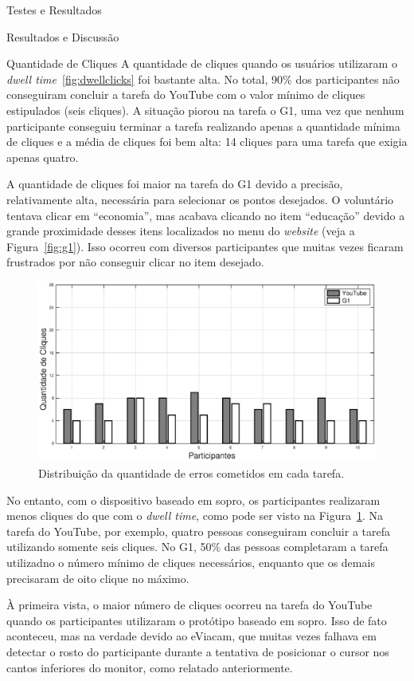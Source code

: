 \begin{chapter}{Testes e Resultados}
\begin{section}{Resultados e Discussão}
\begin{subsection}{Quantidade de Cliques}
A quantidade de cliques quando os usuários utilizaram o \textit{dwell
time}~\ref{fig:dwellclicks} foi bastante alta. No total, 90\% dos participantes
não conseguiram concluir a tarefa do YouTube com o valor mínimo de cliques
estipulados (seis cliques). A situação piorou na tarefa o G1, uma vez que nenhum
participante conseguiu terminar a tarefa realizando apenas a quantidade mínima
de cliques e a média de cliques foi bem alta: 14 cliques para uma tarefa que
exigia apenas quatro.

A quantidade de cliques foi maior na tarefa do G1 devido a precisão,
relativamente alta, necessária para selecionar os pontos desejados. O voluntário
tentava clicar em ``economia'', mas acabava clicando no item ``educação'' devido
a grande proximidade desses itens localizados no menu do \textit{website}
(veja a Figura~\ref{fig:g1}). Isso ocorreu com diversos participantes que muitas
vezes ficaram frustrados por não conseguir clicar no item desejado.

\begin{figure}[!h]
	\centering
	\includegraphics[width=1.00\linewidth]{fig/PuffClicks}
	\caption{Distribuição da quantidade de erros cometidos em cada tarefa.}
	\label{fig:puffclicks}
\end{figure}

No entanto, com o dispositivo baseado em sopro, os participantes realizaram
menos cliques do que com o \textit{dwell time}, como pode ser visto na
Figura~\ref{fig:puffclicks}. Na tarefa do YouTube, por exemplo, quatro pessoas
conseguiram concluir a tarefa utilizando somente seis cliques. No G1, 50\% das
pessoas completaram a tarefa utilizadno o número mínimo de cliques necessários,
enquanto que os demais precisaram de oito clique no máximo.

À primeira vista, o maior número de cliques ocorreu na tarefa do YouTube quando
os participantes utilizaram o protótipo baseado em sopro. Isso de fato
aconteceu, mas na verdade devido ao eViacam, que muitas vezes falhava em
detectar o rosto do participante durante a tentativa de posicionar o cursor nos
cantos inferiores do monitor, como relatado anteriormente.


\end{subsection}
\end{section}
\end{chapter}
